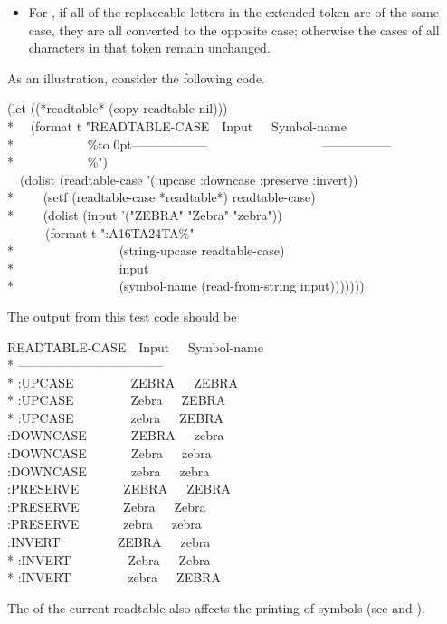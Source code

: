 \begin{newer}
\begin{defun}[Function]
\begin{itemize}
\item For , if all of the replaceable letters
in the extended token are of the same case, they are all converted to the opposite case;
otherwise the cases of all characters in that token remain unchanged.
\end{itemize}
As an illustration, consider the following code.
\begin{lisp}
(let ((*readtable* (copy-readtable nil))) \\*
~~(format t "READTABLE-CASE~~Input~~~Symbol-name{\Xtilde} \\*
~~~~~~~~~~~{\Xtilde}\%\hbox to 0pt{------------------\hss}~~~~~~~~~~~~~~~~~~-----------------{\Xtilde} \\*
~~~~~~~~~~~{\Xtilde}\%") \\
~~(dolist (readtable-case '(:upcase :downcase :preserve :invert)) \\*
~~~~(setf (readtable-case *readtable*) readtable-case) \\*
~~~~(dolist (input '("ZEBRA" "Zebra" "zebra")) \\
~~~~~~(format t ":{\Xtilde}A{\Xtilde}16T{\Xtilde}A{\Xtilde}24T{\Xtilde}A{\Xtilde}\%" \\*
~~~~~~~~~~~~~~~~(string-upcase readtable-case) \\*
~~~~~~~~~~~~~~~~input \\*
~~~~~~~~~~~~~~~~(symbol-name (read-from-string input)))))))
\end{lisp}
The output from this test code should be
\begin{lisp}
READTABLE-CASE~~Input~~~Symbol-name \\*
----------------------------------- \\*
:UPCASE~~~~~~~~~ZEBRA~~~ZEBRA \\*
:UPCASE~~~~~~~~~Zebra~~~ZEBRA \\*
:UPCASE~~~~~~~~~zebra~~~ZEBRA \\
:DOWNCASE~~~~~~~ZEBRA~~~zebra \\
:DOWNCASE~~~~~~~Zebra~~~zebra \\
:DOWNCASE~~~~~~~zebra~~~zebra \\
:PRESERVE~~~~~~~ZEBRA~~~ZEBRA \\
:PRESERVE~~~~~~~Zebra~~~Zebra \\
:PRESERVE~~~~~~~zebra~~~zebra \\
:INVERT~~~~~~~~~ZEBRA~~~zebra \\*
:INVERT~~~~~~~~~Zebra~~~Zebra \\*
:INVERT~~~~~~~~~zebra~~~ZEBRA
\end{lisp}
\end{defun}
The  of the current readtable also affects the printing
of symbols (see  and ).
\end{newer}

